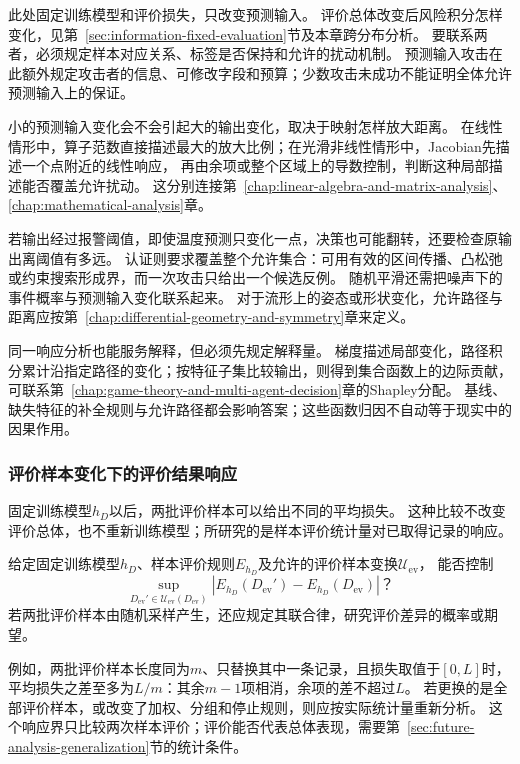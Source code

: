此处固定训练模型和评价损失，只改变预测输入。
评价总体改变后风险积分怎样变化，见第~\ref{sec:information-fixed-evaluation}节及本章跨分布分析。
要联系两者，必须规定样本对应关系、标签是否保持和允许的扰动机制。
预测输入攻击在此额外规定攻击者的信息、可修改字段和预算；少数攻击未成功不能证明全体允许预测输入上的保证。

小的预测输入变化会不会引起大的输出变化，取决于映射怎样放大距离。
在线性情形中，算子范数直接描述最大的放大比例；在光滑非线性情形中，Jacobian先描述一个点附近的线性响应，
再由余项或整个区域上的导数控制，判断这种局部描述能否覆盖允许扰动。
这分别连接第~\ref{chap:linear-algebra-and-matrix-analysis}、\ref{chap:mathematical-analysis}章。

若输出经过报警阈值，即使温度预测只变化一点，决策也可能翻转，还要检查原输出离阈值有多远。
认证则要求覆盖整个允许集合：可用有效的区间传播、凸松弛或约束搜索形成界，而一次攻击只给出一个候选反例。
随机平滑还需把噪声下的事件概率与预测输入变化联系起来。
对于流形上的姿态或形状变化，允许路径与距离应按第~\ref{chap:differential-geometry-and-symmetry}章来定义。

同一响应分析也能服务解释，但必须先规定解释量。
梯度描述局部变化，路径积分累计沿指定路径的变化；按特征子集比较输出，则得到集合函数上的边际贡献，
可联系第~\ref{chap:game-theory-and-multi-agent-decision}章的Shapley分配。
基线、缺失特征的补全规则与允许路径都会影响答案；这些函数归因不自动等于现实中的因果作用。

\subsubsection{评价样本变化下的评价结果响应}
\label{sec:future-analysis-evaluation-sample-response}

固定训练模型$h_D$以后，两批评价样本可以给出不同的平均损失。
这种比较不改变评价总体，也不重新训练模型；所研究的是样本评价统计量对已取得记录的响应。

\begin{mathproblem}[评价样本变换造成的评价差异]
  \label{question:future-evaluation-sample-response}
  给定固定训练模型$h_D$、样本评价规则$E_{h_D}$及允许的评价样本变换$\mathcal U_{\mathrm{ev}}$，
  能否控制
  \[
    \sup_{D_{\mathrm{ev}}'\in\mathcal U_{\mathrm{ev}}(D_{\mathrm{ev}})}
      |E_{h_D}(D_{\mathrm{ev}}')-E_{h_D}(D_{\mathrm{ev}})|\text{？}
  \]
  若两批评价样本由随机采样产生，还应规定其联合律，研究评价差异的概率或期望。
\end{mathproblem}

例如，两批评价样本长度同为$m$、只替换其中一条记录，且损失取值于$[0,L]$时，
平均损失之差至多为$L/m$：其余$m-1$项相消，余项的差不超过$L$。
若更换的是全部评价样本，或改变了加权、分组和停止规则，则应按实际统计量重新分析。
这个响应界只比较两次样本评价；评价能否代表总体表现，需要第~\ref{sec:future-analysis-generalization}节的统计条件。

